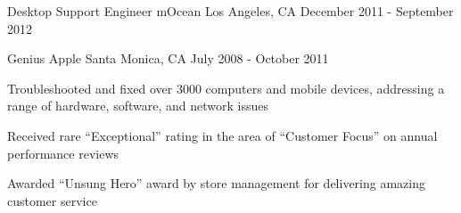 \begin{cventries}
  \cventry
    {Desktop Support Engineer} %
    {mOcean} %
    {Los Angeles, CA } %
    {December 2011 - September 2012} %
    {}

  \cventry
    {Genius} %
    {Apple} %
    {Santa Monica, CA} %
    {July 2008 - October 2011} %
    {
      \begin{cvitems} %
        \item {Troubleshooted and fixed over 3000 computers and mobile devices, addressing a range of hardware, software, and network issues}
        \item {Received rare ``Exceptional'' rating in the area of ``Customer Focus'' on annual performance reviews}
        \item {Awarded ``Unsung Hero'' award by store management for delivering amazing customer service}
      \end{cvitems}
    }

\end{cventries}
